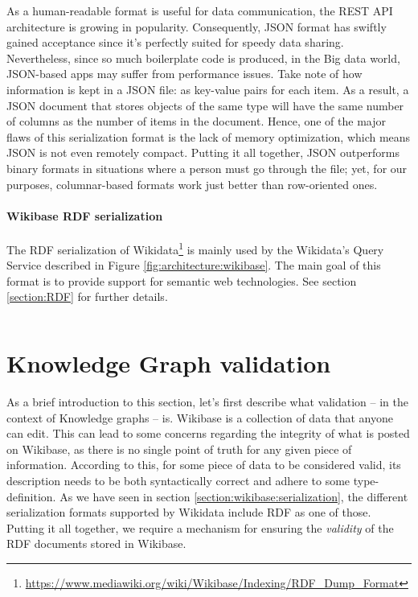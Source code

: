 As a human-readable format is useful for data communication, the REST API architecture is growing in popularity. Consequently, JSON format has swiftly gained acceptance since it's perfectly suited for speedy data sharing. Nevertheless, since so much boilerplate code is produced, in the Big data world, JSON-based apps may suffer from performance issues. Take note of how information is kept in a JSON file: as key-value pairs for each item. As a result, a JSON document that stores objects of the same type will have the same number of columns as the number of items in the document. Hence, one of the major flaws of this serialization format is the lack of memory optimization, which means JSON is not even remotely compact. Putting it all together, JSON outperforms binary formats in situations where a person must go through the file; yet, for our purposes, columnar-based formats work just better than row-oriented ones.

\paragraph[Wikibase RDF serialization]{Wikibase RDF serialization\footnotemark}

The RDF serialization of Wikidata\footnote{\url{https://www.mediawiki.org/wiki/Wikibase/Indexing/RDF_Dump_Format}} is mainly used by the Wikidata's Query Service described in Figure \ref{fig:architecture:wikibase}. The main goal of this format is to provide support for semantic web technologies. See section \ref{section:RDF} for further details.

\begin{dumps}
    \inputminted{turtle}{code/listings/6-2_serialization.rdf}
\end{dumps}

\section{Knowledge Graph validation}

As a brief introduction to this section, let's first describe what validation -- in the context of Knowledge graphs -- is. Wikibase is a collection of data that anyone can edit. This can lead to some concerns regarding the integrity of what is posted on Wikibase, as there is no single point of truth for any given piece of information. According to this, for some piece of data to be considered valid, its description needs to be both syntactically correct and adhere to some type-definition. As we have seen in section \ref{section:wikibase:serialization}, the different serialization formats supported by Wikidata include RDF as one of those. Putting it all together, we require a mechanism for ensuring the \textit{validity} of the RDF documents stored in Wikibase.

